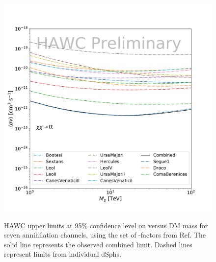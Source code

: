 \begin{figure}[ht]
{    \includegraphics[scale=0.21]{figures/glory_duck/hawc/Combined95_GD_tt.pdf}
    }
    \caption{HAWC upper limits at 95\% confidence level on \sv versus DM mass for seven annihilation channels, using the set of \J-factors from Ref. \cite{Geringer-Sameth:2014yza} The solid line represents the observed combined limit. Dashed lines represent limits from individual dSphs.}
\label{fig:hawc_combined_limit}
\end{figure}


